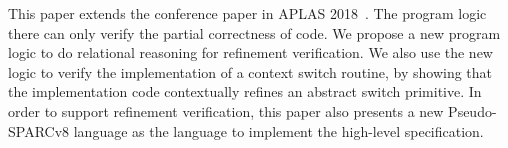 This paper extends the conference paper in
APLAS 2018~\cite{zha18aplas}.
The program logic there can only verify the partial
correctness of \sparc{} code. We propose a new 
program logic to do relational reasoning for
refinement verification. We also use the new logic
to verify the implementation of a context switch routine,
by showing that the implementation code contextually
refines an abstract switch primitive.
In order to support refinement verification,
this paper also presents a new Pseudo-SPARCv8 language
as the language to implement the high-level specification.




